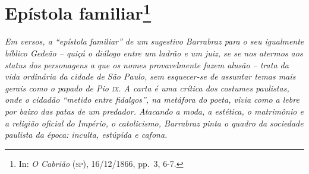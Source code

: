 \chapter{Epístola familiar\footnote{In: \emph{O Cabrião} (\textsc{sp}), 16/12/1866, pp.~3, 6-7.}}
\begin{didascalia}                                        
\emph{Em versos, a ``epístola familiar'' de um sugestivo Barrabraz para o
seu igualmente bíblico Gedeão -- quiçá o diálogo entre um ladrão e um
juiz, se se nos atermos aos status dos personagens a que os nomes
provavelmente fazem alusão -- trata da vida ordinária da cidade de São
Paulo, sem esquecer-se de assuntar temas mais gerais como o papado de
Pio \textsc{ix}. A carta é uma crítica dos costumes paulistas, onde o cidadão
``metido entre fidalgos'', na metáfora do poeta, vivia como a lebre por
baixo das patas de um predador. Atacando a moda, a estética, o
matrimônio e a religião oficial do Império, o catolicismo, Barrabraz
pinta o quadro da sociedade paulista da época: inculta, estúpida e
cafona.}
\end{didascalia}



